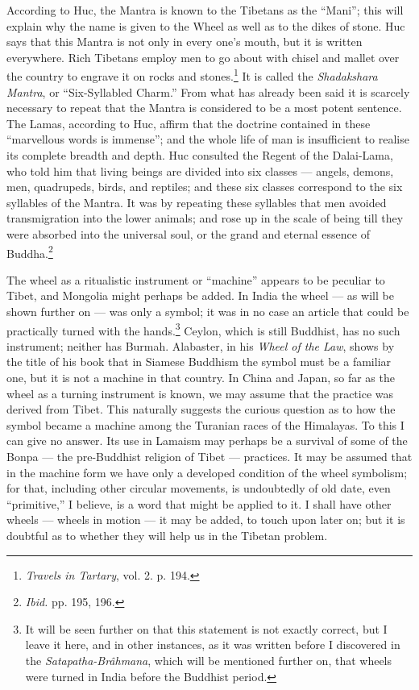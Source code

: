 \documentclass[a4paper, 11pt, oneside, polutonikogreek, english]{article}
\begin{document}
According to Huc, the Mantra is known to the Tibetans as the ``Mani''; this will explain why the name is given to the Wheel as well as to the dikes of stone. Huc says that this Mantra is not only in every one's mouth, but it is written everywhere. Rich Tibetans employ men to go about with chisel and mallet over the country to engrave it on rocks and stones.\footnote{\emph{Travels in Tartary}, vol. 2. p. 194.} It is called the \emph{Shadakshara Mantra}, or ``Six-Syllabled Charm.'' From what has already been said it is scarcely necessary to repeat that the Mantra is considered to be a most potent sentence. The Lamas, according to Huc, affirm that the doctrine contained in these ``marvellous words is immense''; and the whole life of man is insufficient to realise its complete breadth and depth. Huc consulted the Regent of the Dalai-Lama, who told him that living beings are divided into six classes --- angels, demons, men, quadrupeds, birds, and reptiles; and these six classes correspond to the six syllables of the Mantra. It was by repeating these syllables that men avoided transmigration into the lower animals; and rose up in the scale of being till they were absorbed into the universal soul, or the grand and eternal essence of Buddha.\footnote{\emph{Ibid.} pp. 195, 196.}

The wheel as a ritualistic instrument or ``machine'' appears to be peculiar to Tibet, and Mongolia might perhaps be added. In India the wheel --- as will be shown further on --- was only a symbol; it was in no case an article that could be practically turned with the hands.\footnote{It will be seen further on that this statement is not exactly correct, but I leave it here, and in other instances, as it was written before I discovered in the \emph{Satapatha-Brâhmana}, which will be mentioned further on, that wheels were turned in India before the Buddhist period.} Ceylon, which is still Buddhist, has no such instrument; neither has Burmah. Alabaster, in his \emph{Wheel of the Law}, shows by the title of his book that in Siamese Buddhism the symbol must be a familiar one, but it is not a machine in that country. In China and Japan, so far as the wheel as a turning instrument is known, we may assume that the practice was derived from Tibet. This naturally suggests the curious question as to how the symbol became a machine among the Turanian races of the Himalayas. To this I can give no answer. Its use in Lamaism may perhaps be a survival of some of the Bonpa --- the pre-Buddhist religion of Tibet --- practices. It may be assumed that in the machine form we have only a developed condition of the wheel symbolism; for that, including other circular movements, is undoubtedly of old date, even ``primitive,'' I believe, is a word that might be applied to it. I shall have other wheels --- wheels in motion --- it may be added, to touch upon later on; but it is doubtful as to whether they will help us in the Tibetan problem.
\end{document}
